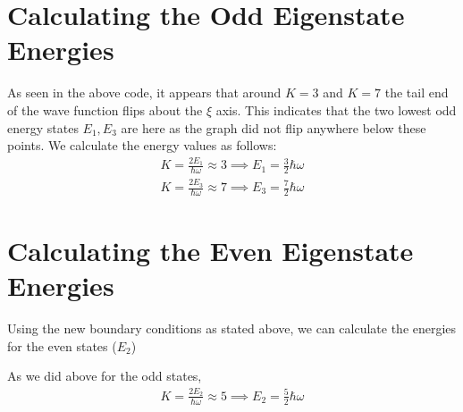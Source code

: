\documentclass[letterpaper,10pt,english]{jupyterBook}
\begin{document}
\chapter{Calculating the Odd Eigenstate Energies}
\label{\detokenize{2.56:calculating-the-odd-eigenstate-energies}}
\sphinxAtStartPar
As seen in the above code, it appears that around \(K=3\) and \(K=7\) the tail end of the wave function flips about the \(\xi\) axis. This indicates that the two lowest odd energy states \(E_1, E_3\) are here as the graph did not flip anywhere below these points. We calculate the energy values as follows:
\begin{equation*}
\begin{split}
K=\frac{2E_1}{\hbar\omega} \approx 3 \implies E_1 = \frac{3}{2}\hbar\omega
\end{split}
\end{equation*}\begin{equation*}
\begin{split}
K=\frac{2E_3}{\hbar\omega} \approx 7 \implies E_3 = \frac{7}{2}\hbar\omega
\end{split}
\end{equation*}

\chapter{Calculating the Even Eigenstate Energies}
\label{\detokenize{2.56:calculating-the-even-eigenstate-energies}}
\sphinxAtStartPar
Using the new boundary conditions as stated above, we can calculate the energies for the even states (\(E_2\))

\begin{sphinxVerbatim}[commandchars=\\\{\}]
  
\end{sphinxVerbatim}

\noindent{}

\sphinxAtStartPar
As we did above for the odd states,
\begin{equation*}
\begin{split}
K=\frac{2E_2}{\hbar\omega} \approx 5 \implies E_2 = \frac{5}{2}\hbar\omega
\end{split}
\end{equation*}
\end{document}

